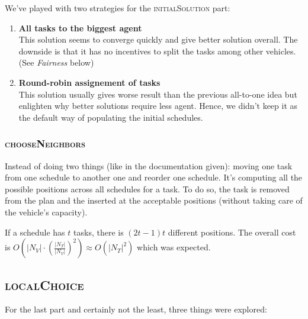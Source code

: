 \documentclass[11pt,a4paper]{article}
\begin{document}
We've played with two strategies for the \textsc{initialSolution} part:

\begin{enumerate}
    \item \textbf{All tasks to the biggest agent}\\
        This solution seems to converge quickly and give better solution
        overall. The downside is that it has no incentives to split the tasks
        among other vehicles. (See \emph{Fairness} below)

    \item \textbf{Round-robin assignement of tasks}\\
        This solution usually gives worse result than the previous all-to-one
        idea but enlighten why better solutions require less agent. Hence, we
        didn't keep it as the default way of populating the initial schedules.

\end{enumerate}


\subsubsection*{\textsc{chooseNeighbors}}

Instead of doing two things (like in the documentation given): moving one task
from one schedule to another one and reorder one schedule. It's computing all
the possible positions across all schedules for a task. To do so, the task is
removed from the plan and the inserted at the acceptable positions (without
taking care of the vehicle's capacity).

If a schedule has $t$ tasks, there is $(2t - 1)t$ different positions. The
overall cost is $O(|N_V| \cdot (\frac{|N_T|}{|N_V|})^2) \approx O(|N_T|^2)$ which was
expected.


\subsection*{\textsc{localChoice}}

For the last part and certainly not the least, three things were explored:
\end{document}
